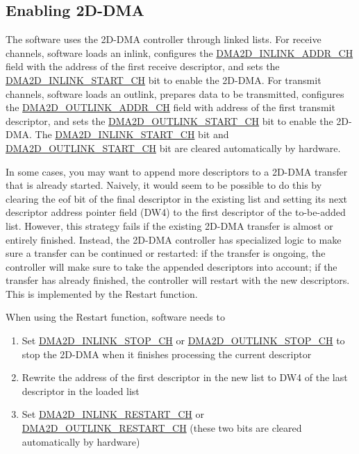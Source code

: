 \documentclass[main\_\_EN.tex]{subfiles}
\begin{document}
\subsection{Enabling 2D-DMA}

The software uses the 2D-DMA controller through linked lists. For receive channels, software loads an inlink, configures the \hyperref[fielddesc:DMA2DINLINKADDRCHN]{DMA2D\_INLINK\_ADDR\_CH} field with the address of the first receive descriptor, and sets the \hyperref[fielddesc:DMA2DINLINKSTARTCHN]{DMA2D\_INLINK\_START\_CH} bit to enable the 2D-DMA. For transmit channels, software loads an outlink, prepares data to be transmitted, configures the \hyperref[fielddesc:DMA2DOUTLINKADDRCHN]{DMA2D\_OUTLINK\_ADDR\_CH} field with address of the first transmit descriptor, and sets the \hyperref[fielddesc:DMA2DOUTLINKSTARTCHN]{DMA2D\_OUTLINK\_START\_CH} bit to enable the 2D-DMA. The \hyperref[fielddesc:DMA2DINLINKSTARTCHN]{DMA2D\_INLINK\_START\_CH} bit and \hyperref[fielddesc:DMA2DOUTLINKSTARTCHN]{DMA2D\_OUTLINK\_START\_CH} bit are cleared automatically by hardware.

In some cases, you may want to append more descriptors to a 2D-DMA transfer that is already started. Naively, it would seem to be possible to do this by clearing the eof bit of the final descriptor in the existing list and setting its next descriptor address pointer field (DW4) to the first descriptor of the to-be-added list. However, this strategy fails if the existing 2D-DMA transfer is almost or entirely finished. Instead, the 2D-DMA controller has specialized logic to make sure a transfer can be continued or restarted: if the transfer is ongoing, the controller will make sure to take the appended descriptors into account; if the transfer has already finished, the controller will restart with the new descriptors. This is implemented by the Restart function.

When using the Restart function, software needs to
\begin{enumerate}
    \item Set \hyperref[fielddesc:DMA2DINLINKSTOPCHN]{DMA2D\_INLINK\_STOP\_CH} or \hyperref[fielddesc:DMA2DOUTLINKSTOPCHN]{DMA2D\_OUTLINK\_STOP\_CH} to stop the 2D-DMA when it finishes processing the current descriptor
    \item Rewrite the address of the first descriptor in the new list to DW4 of the last descriptor in the loaded list
    \item Set \hyperref[fielddesc:DMA2DINLINKRESTARTCHN]{DMA2D\_INLINK\_RESTART\_CH} or \hyperref[fielddesc:DMA2DOUTLINKRESTARTCHN]{DMA2D\_OUTLINK\_RESTART\_CH} (these two bits are cleared automatically by hardware)
\end{enumerate}
\end{document}
